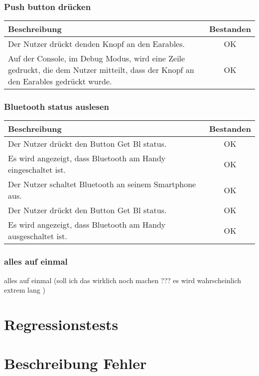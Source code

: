 \documentclass[a4paper,12pt]{article}
\begin{document}
\subsubsection{Push button drücken}
\begin{tabular}{ | p{12cm} | c| }
	\hline
	\textbf{Beschreibung} & \textbf{Bestanden}\\
	\hline
	Der Nutzer drückt denden Knopf an den Earables. & OK\\
	\hline
	Auf der Console, im Debug Modus, wird eine Zeile gedruckt, die dem Nutzer mitteilt, dass der Knopf an den Earables gedrückt wurde. & OK\\
	\hline
\end{tabular}

\subsubsection{Bluetooth status auslesen}
\begin{tabular}{ | p{12cm} | c| }
	\hline
	\textbf{Beschreibung} & \textbf{Bestanden}\\
	\hline
	Der Nutzer drückt den Button \glqq{}Get Bl status\grqq{}. & OK\\
	\hline
	Es wird angezeigt, dass Bluetooth am Handy eingeschaltet ist. & OK\\
	\hline
	Der Nutzer schaltet Bluetooth an seinem Smartphone aus. & OK\\
	\hline
	\hline
	Der Nutzer drückt den Button \glqq{}Get Bl status\grqq{}. & OK\\
	\hline
	Es wird angezeigt, dass Bluetooth am Handy ausgeschaltet ist. & OK\\
	\hline
\end{tabular}
\subsubsection{alles auf einmal}
alles auf einmal (soll ich das wirklich noch machen ??? es wird wahrscheinlich extrem lang )



\section{Regressionstests}

\section{Beschreibung Fehler}
\end{document}
